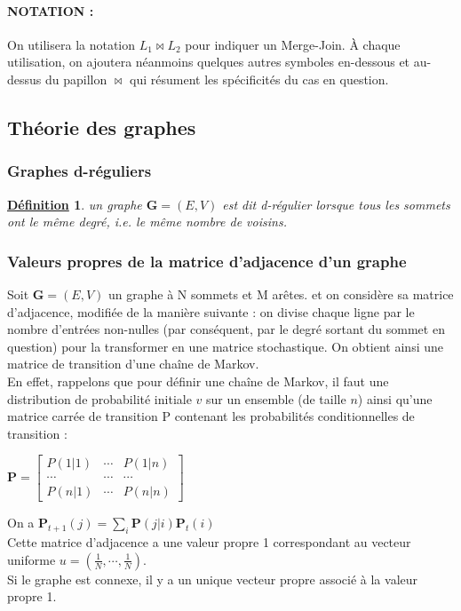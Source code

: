 \documentclass[12pt,openany]{report}
\newtheorem{definition}{\underline{Définition}}
\begin{document}
\paragraph{NOTATION :} On utilisera la notation $L_1 \bowtie L_2$  pour indiquer un Merge-Join. À
chaque utilisation, on ajoutera néanmoins quelques autres symboles en-dessous
et au-dessus du papillon  $\bowtie$ qui résument les spécificités du cas en question.



\subsection{Théorie des graphes}
\subsubsection{Graphes d-réguliers}
\begin{definition} un graphe $ \mathbf{G}=(E,V)$ est dit d-régulier lorsque tous les sommets ont le même degré, i.e. le même nombre de voisins.
\end{definition}
\subsubsection{Valeurs propres de la matrice d'adjacence d'un graphe}

Soit $\mathbf{G} = (E, V )$ un graphe à N sommets et M arêtes. et on considère sa
matrice d’adjacence, modifiée de la manière suivante : on divise chaque ligne par
le nombre d’entrées non-nulles (par conséquent, par le degré sortant du sommet
en question) pour la transformer en une matrice stochastique. On obtient ainsi
une matrice de transition d’une chaîne de Markov.\\
En effet, rappelons que pour définir une chaîne de Markov, il faut une distribution de probabilité initiale $v$ sur un ensemble (de taille $n$) ainsi qu’une matrice carrée
de transition P contenant les probabilités conditionnelles de transition :\\
\begin{center}
$ \mathbf{P}=\begin{bmatrix}
P(1|1)& \cdots & P(1|n)\\
\cdots & \cdots & \cdots\\
P(n|1) & \cdots &P(n|n)

\end{bmatrix}$
\end{center}
On a $\mathbf{P}_{t+1}(j)=\sum_{i}\mathbf{P}(j|i)\mathbf{P}_t(i)$\\
Cette matrice d'adjacence a une valeur propre 1 correspondant au vecteur uniforme $ u=(\frac{1}{N},\cdots,\frac{1}{N})$.\\
Si le graphe est connexe, il y a un unique vecteur propre associé à la valeur
propre 1.
\end{document}
